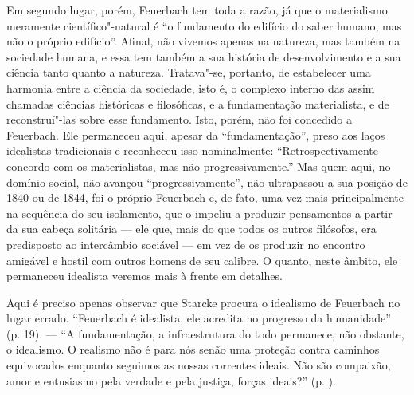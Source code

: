 Em segundo lugar,
porém, Feuerbach tem
toda a razão, já que o materialismo meramente científico"-natural é ``o
fundamento do edifício do saber humano, mas não o próprio edifício''.
Afinal, não vivemos apenas na natureza, mas também na sociedade humana,
e essa tem também a sua história de desenvolvimento e a sua ciência
tanto quanto a natureza. Tratava"-se, portanto, de estabelecer uma
harmonia entre a ciência da sociedade, isto é, o complexo interno
das assim chamadas ciências históricas e filosóficas, 
e a fundamentação materialista, e de reconstruí"-las sobre esse 
fundamento. Isto, porém, não foi concedido
a Feuerbach.
Ele permaneceu aqui, apesar da ``fundamentação'', preso aos laços
idealistas tradicionais e reconheceu isso nominalmente:
``Retrospectivamente concordo com os materialistas, mas não
progressivamente.'' Mas quem aqui, no domínio social, não avançou
``progressivamente'', não ultrapassou a sua posição de 1840 ou de 1844,
foi o
próprio Feuerbach e,
de fato, uma vez mais principalmente na sequência do seu isolamento,
que o impeliu a produzir pensamentos a partir da sua 
cabeça solitária --- ele que, mais do que todos os outros filósofos, era
predisposto ao intercâmbio sociável --- em vez de os produzir no encontro
amigável e hostil com outros homens de seu calibre. O quanto, neste
âmbito, ele permaneceu idealista veremos mais à frente em detalhes.

Aqui é preciso apenas observar que Starcke procura o idealismo
de Feuerbach no
lugar errado.
``Feuerbach é
idealista, ele acredita no progresso da humanidade'' (p. 19). --- ``A
fundamentação, a infraestrutura do todo permanece, 
não obstante, o idealismo. O realismo não é para nós senão uma proteção
contra caminhos equivocados enquanto seguimos as nossas correntes
ideais. Não são compaixão, amor e entusiasmo pela verdade e pela %
justiça, forças ideais?'' (p. ).

